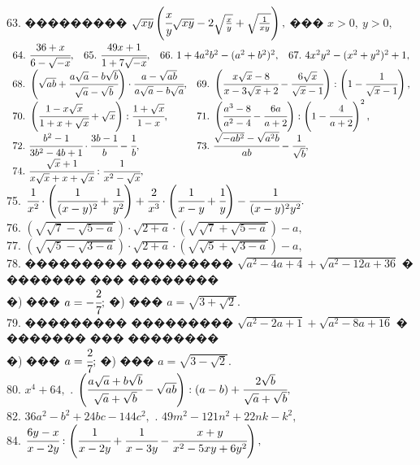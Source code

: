 \documentclass[12pt]{article}
\begin{document}
63. ��������� $\sqrt{xy}\left(\cfrac{x}{y}\sqrt{xy}-2\sqrt{\frac{x}{y}}+\sqrt{\frac{1}{xy}}\right),$ ��� $x>0,\ y>0,$\\
$\begin{array}{llll}
64.\ \cfrac{36+x}{6-\sqrt{-x}},&
65.\ \cfrac{49x+1}{1+7\sqrt{-x}},&
66.\ 1+4a^2b^2-(a^2+b^2)^2,&
67.\ 4x^2y^2-(x^2+y^2)^2+1,
\end{array}$\\
$\begin{array}{llll}
68.\ \left(\sqrt{ab}+\cfrac{a\sqrt{a}-b\sqrt{b}}{\sqrt{a}-\sqrt{b}}\right)\cdot\cfrac{a-\sqrt{ab}}{
a\sqrt{a}-b\sqrt{a}},&
69.\ \left(\cfrac{x\sqrt{x}-8}{x-3\sqrt{x}+2}-\cfrac{6\sqrt{x}}{\sqrt{x}-1}\right):
\left(1-\cfrac{1}{\sqrt{x}-1}\right),\\
70.\ \left(\cfrac{1-x\sqrt{x}}{1+x+\sqrt{x}}+\sqrt{x}\right): \cfrac{1+\sqrt{x}}{1-x},&
71.\ \left(\cfrac{a^3-8}{a^2-4}-\cfrac{6a}{a+2}\right): \left(1-\cfrac{4}{a+2}\right)^2,\\
72.\ \cfrac{b^2-1}{3b^2-4b+1}\cdot\cfrac{3b-1}{b}-\cfrac{1}{b},&
73.\ \cfrac{\sqrt{-ab^2}-\sqrt{a^2b}}{ab}-\cfrac{1}{\sqrt{b}},\\
74.\ \cfrac{\sqrt{x}+1}{x\sqrt{x}+x+\sqrt{x}}:\cfrac{1}{x^2-\sqrt{x}},\end{array}$\\
75. $\cfrac{1}{x^2}\cdot\left(\cfrac{1}{(x-y)^2}+\cfrac{1}{y^2}\right)+\cfrac{2}{x^3}\cdot\left(
\cfrac{1}{x-y}+\cfrac{1}{y}\right)-\cfrac{1}{(x-y)^2y^2}.$\\
76. $\left(\sqrt{\sqrt{7}-\sqrt{5-a}}\right)\cdot\sqrt{2+a}\cdot\left(\sqrt{\sqrt{7}+\sqrt{5-a}}\right)-a,$\\
77. $\left(\sqrt{\sqrt{5}-\sqrt{3-a}}\right)\cdot\sqrt{2+a}\cdot\left(\sqrt{\sqrt{5}+\sqrt{3-a}}\right)-a,$\\
78. ��������� ��������� $\sqrt{a^2-4a+4}+\sqrt{a^2-12a+36}$ � ������� ��� ��������\\
�) ��� $a=-\cfrac{2}{7};$ �) ��� $a=\sqrt{3+\sqrt{2}}.$\\
79. ��������� ��������� $\sqrt{a^2-2a+1}+\sqrt{a^2-8a+16}$ � ������� ��� ��������\\
�) ��� $a=\cfrac{2}{7};$ �) ��� $a=\sqrt{3-\sqrt{2}}.$\\
80. $x^4+64,$ \qquad {}. $\left(\cfrac{a\sqrt{a}+b\sqrt{b}}{\sqrt{a}+\sqrt{b}}-\sqrt{ab}\right):(a-b)+\cfrac{2\sqrt{b}}{\sqrt{a}+\sqrt{b}},$\\
82. $36a^2-b^2+24bc-144c^2,$ \qquad {}. $49m^2-121n^2+22nk-k^2,$\\
84. $\cfrac{6y-x}{x-2y}:\left(\cfrac{1}{x-2y}+\cfrac{1}{x-3y}-\cfrac{x+y}{x^2-5xy+6y^2}\right),$
\end{document}
